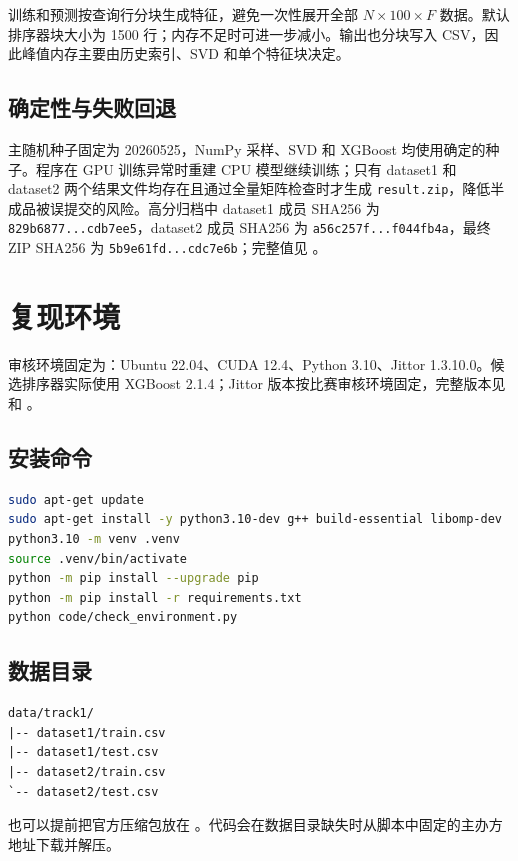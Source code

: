 \documentclass[UTF8,a4paper,11pt]{ctexart}
\begin{document}
训练和预测按查询行分块生成特征，避免一次性展开全部 $N\times100\times F$ 数据。默认排序器块大小为 1500 行；内存不足时可进一步减小。输出也分块写入 CSV，因此峰值内存主要由历史索引、SVD 和单个特征块决定。

\subsection{确定性与失败回退}

主随机种子固定为 20260525，NumPy 采样、SVD 和 XGBoost 均使用确定的种子。程序在 GPU 训练异常时重建 CPU 模型继续训练；只有 dataset1 和 dataset2 两个结果文件均存在且通过全量矩阵检查时才生成 \texttt{result.zip}，降低半成品被误提交的风险。高分归档中 dataset1 成员 SHA256 为 \texttt{829b6877...cdb7ee5}，dataset2 成员 SHA256 为 \texttt{a56c257f...f044fb4a}，最终 ZIP SHA256 为 \texttt{5b9e61fd...cdc7e6b}；完整值见 。

\section{复现环境}

审核环境固定为：Ubuntu 22.04、CUDA 12.4、Python 3.10、Jittor 1.3.10.0。候选排序器实际使用 XGBoost 2.1.4；Jittor 版本按比赛审核环境固定，完整版本见  和 。

\subsection{安装命令}

\begin{lstlisting}[language=bash]
sudo apt-get update
sudo apt-get install -y python3.10-dev g++ build-essential libomp-dev
python3.10 -m venv .venv
source .venv/bin/activate
python -m pip install --upgrade pip
python -m pip install -r requirements.txt
python code/check_environment.py
\end{lstlisting}

\subsection{数据目录}

\begin{lstlisting}
data/track1/
|-- dataset1/train.csv
|-- dataset1/test.csv
|-- dataset2/train.csv
`-- dataset2/test.csv
\end{lstlisting}

也可以提前把官方压缩包放在 。代码会在数据目录缺失时从脚本中固定的主办方地址下载并解压。
\end{document}
